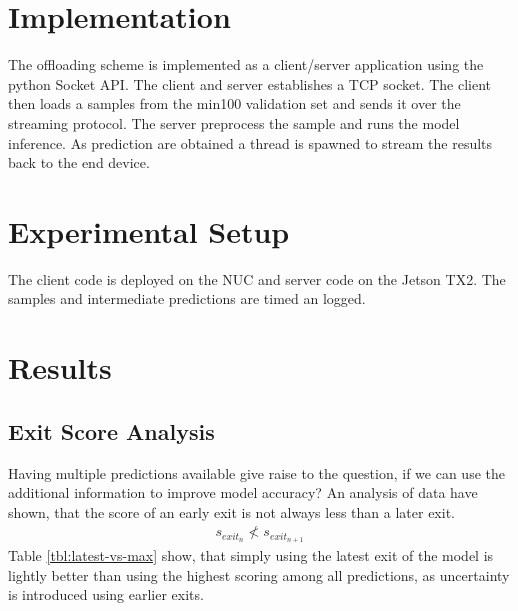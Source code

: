 \section{Implementation}

The offloading scheme is implemented as a client/server application using the \gls{python} Socket API. The client and server establishes a TCP socket. The client then loads a samples from the \gls{min100} validation set and sends it over the streaming protocol. The server preprocess the sample and runs the model inference. As prediction are obtained a thread is spawned to stream the results back to the end device. 

\section{Experimental Setup}

The client code is deployed on the NUC and server code on the Jetson TX2. The samples and intermediate predictions are timed an logged. 

\section{Results}



\subsection{Exit Score Analysis}

Having multiple predictions available give raise to the question, if we can use the additional information to improve model accuracy? An analysis of data have shown, that the score of an early exit is not always less than a later exit.
\begin{align*}
	s_{exit_{n}} \nless s_{exit_{n+1}}
\end{align*} 
Table \ref{tbl:latest-vs-max} show, that simply using the latest exit of the model is lightly better than using the highest scoring among all predictions, as uncertainty is introduced using earlier exits.  

